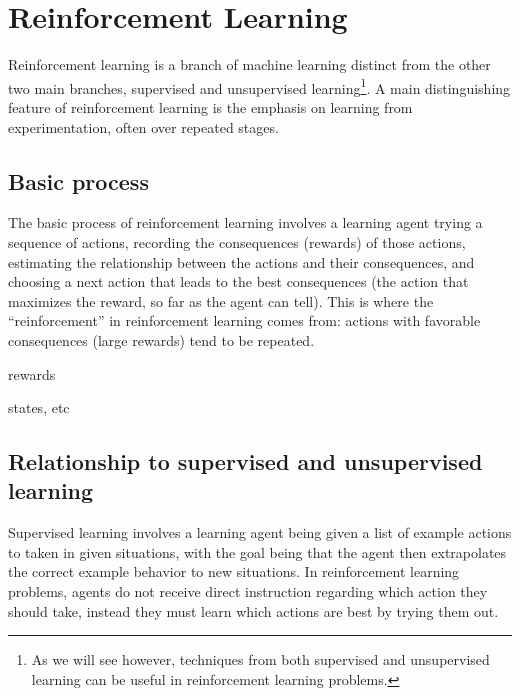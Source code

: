 \documentclass[12pt]{article}
\begin{document}
\section{Reinforcement Learning} %
\label{sec:reinforcement_learning}


Reinforcement learning is a branch of machine learning distinct from the other two main branches, supervised and unsupervised learning\footnote{As we will see however, techniques from both supervised and unsupervised learning can be useful in reinforcement learning problems.}. A main distinguishing feature of reinforcement learning is the emphasis on learning from experimentation, often over repeated stages.

\subsection{Basic process} %
\label{sub:basic_process}

The basic process of reinforcement learning involves a learning agent trying a sequence of actions, recording the consequences (rewards) of those actions, estimating the relationship between the actions and their consequences, and choosing a next action that leads to the best consequences (the action that maximizes the reward, so far as the agent can tell). This is where the ``reinforcement'' in reinforcement learning comes from: actions with favorable consequences (large rewards) tend to be repeated.

rewards

states, etc 




\subsection{Relationship to supervised and unsupervised learning} %
\label{sub:relationship_to_supervise_and_unsupervised_learning}

Supervised learning involves a learning agent being given a list of example actions to taken in given situations, with the goal being that the agent then extrapolates the correct example behavior to new situations. In reinforcement learning problems, agents do not receive direct instruction regarding which action they should take, instead they must learn which actions are best by trying them out. 
\end{document}
